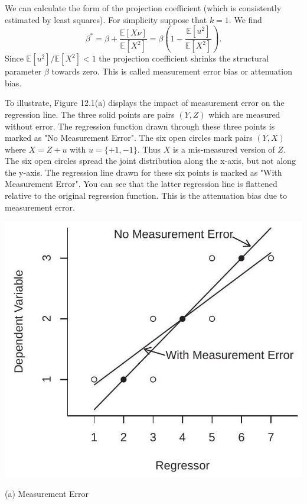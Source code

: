 \documentclass[10pt]{article}
\begin{document}
We can calculate the form of the projection coefficient (which is consistently estimated by least squares). For simplicity suppose that $k=1$. We find
$$
\beta^{*}=\beta+\frac{\mathbb{E}[X \nu]}{\mathbb{E}\left[X^{2}\right]}=\beta\left(1-\frac{\mathbb{E}\left[u^{2}\right]}{\mathbb{E}\left[X^{2}\right]}\right) .
$$
Since $\mathbb{E}\left[u^{2}\right] / \mathbb{E}\left[X^{2}\right]<1$ the projection coefficient shrinks the structural parameter $\beta$ towards zero. This is called measurement error bias or attenuation bias.

To illustrate, Figure 12.1(a) displays the impact of measurement error on the regression line. The three solid points are pairs $(Y, Z)$ which are measured without error. The regression function drawn through these three points is marked as "No Measurement Error". The six open circles mark pairs $(Y, X)$ where $X=Z+u$ with $u=\{+1,-1\}$. Thus $X$ is a mis-measured version of $Z$. The six open circles spread the joint distribution along the $\mathrm{x}$-axis, but not along the $\mathrm{y}$-axis. The regression line drawn for these six points is marked as "With Measurement Error". You can see that the latter regression line is flattened relative to the original regression function. This is the attenuation bias due to measurement error.

\includegraphics[max width=\textwidth]{2022_09_17_f9391324ededdbb7a34eg-03}

(a) Measurement Error
\end{document}
